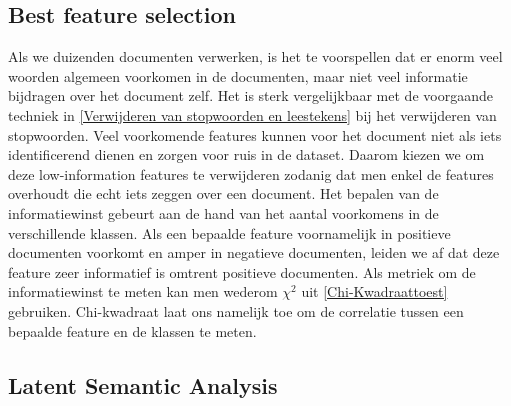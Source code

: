 \subsection{Best feature selection}\label{Low-information feature el}

Als we duizenden documenten verwerken, is het te voorspellen dat er enorm veel woorden algemeen voorkomen in de documenten, maar niet veel informatie bijdragen over het document zelf. Het is sterk vergelijkbaar met de voorgaande techniek in \ref{Verwijderen van stopwoorden en leestekens} bij het verwijderen van stopwoorden. Veel voorkomende features kunnen voor het document niet als iets identificerend dienen en zorgen voor ruis in de dataset. Daarom kiezen we om deze low-information features te verwijderen zodanig dat men enkel de features overhoudt die echt iets zeggen over een document. Het bepalen van de informatiewinst gebeurt aan de hand van het aantal voorkomens in de verschillende klassen. Als een bepaalde feature voornamelijk in positieve documenten voorkomt en amper in negatieve documenten, leiden we af dat deze feature zeer informatief is omtrent positieve documenten. Als metriek om de informatiewinst te meten kan men wederom ${\chi}^2$ uit \ref{Chi-Kwadraattoest} gebruiken. Chi-kwadraat laat ons namelijk toe om de correlatie tussen een bepaalde feature en de klassen te meten.
%
\subsection{Latent Semantic Analysis}\label{Latent Semantic Analysis}

